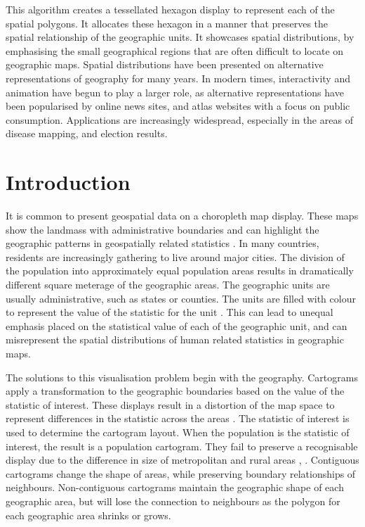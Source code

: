 \documentclass{monashthesis}
\begin{document}
This algorithm creates a tessellated hexagon display to represent each of the spatial polygons. It allocates these hexagon in a manner that preserves the spatial relationship of the geographic units. It showcases spatial distributions, by emphasising the small geographical regions that are often difficult to locate on geographic maps. Spatial distributions have been presented on alternative representations of geography for many years. In modern times, interactivity and animation have begun to play a larger role, as alternative representations have been popularised by online news sites, and atlas websites with a focus on public consumption. Applications are increasingly widespread, especially in the areas of disease mapping, and election results.

\hypertarget{introduction-1}{%
\section{Introduction}\label{introduction-1}}

It is common to present geospatial data on a choropleth map display. These maps show the landmass with administrative boundaries and can highlight the geographic patterns in geospatially related statistics \autocite{SAMGIS}.
In many countries, residents are increasingly gathering to live around major cities.
The division of the population into approximately equal population areas results in dramatically different square meterage of the geographic areas. The geographic units are usually administrative, such as states or counties. The units are filled with colour to represent the value of the statistic for the unit \autocite{EI}.
This can lead to unequal emphasis placed on the statistical value of each of the geographic unit, and can misrepresent the spatial distributions of human related statistics in geographic maps.

The solutions to this visualisation problem begin with the geography. Cartograms apply a transformation to the geographic boundaries based on the value of the statistic of interest. These displays result in a distortion of the map space to represent differences in the statistic across the areas \autocite{ACCAC}.
The statistic of interest is used to determine the cartogram layout. When the
population is the statistic of interest, the result is a population cartogram. They fail to preserve a recognisable display due to the difference in size of metropolitan and rural areas \autocite{ACTUC}, \autocite{GOINO}.
Contiguous cartograms change the shape of areas, while preserving boundary relationships of neighbours. Non-contiguous cartograms maintain the geographic shape of each geographic area, but will lose the connection to neighbours as the polygon for each geographic area shrinks or grows.
\end{document}
